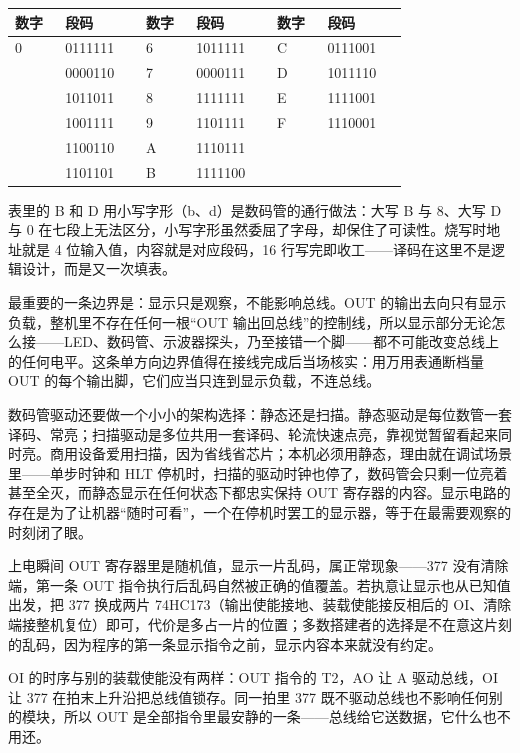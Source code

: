 \begin{longtable}{L{0.10\linewidth}L{0.16\linewidth}L{0.10\linewidth}L{0.16\linewidth}L{0.10\linewidth}L{0.16\linewidth}}
\toprule
数字 & 段码 & 数字 & 段码 & 数字 & 段码 \\
 & 0111111 & 6 & 1011111 & C & 0111001 \\ & 0000110 & 7 & 0000111 & D & 1011110 \\ & 1011011 & 8 & 1111111 & E & 1111001 \\ & 1001111 & 9 & 1101111 & F & 1110001 \\ & 1100110 & A & 1110111 & & \\ & 1101101 & B & 1111100 & & \\
\bottomrule
\end{longtable}

表里的 B 和 D 用小写字形（b、d）是数码管的通行做法：大写 B 与 8、大写 D 与 0 在七段上无法区分，小写字形虽然委屈了字母，却保住了可读性。烧写时地址就是 4 位输入值，内容就是对应段码，16 行写完即收工——译码在这里不是逻辑设计，而是又一次填表。

最重要的一条边界是：显示只是观察，不能影响总线。OUT 的输出去向只有显示负载，整机里不存在任何一根“OUT 输出回总线”的控制线，所以显示部分无论怎么接——LED、数码管、示波器探头，乃至接错一个脚——都不可能改变总线上的任何电平。这条单方向边界值得在接线完成后当场核实：用万用表通断档量 OUT 的每个输出脚，它们应当只连到显示负载，不连总线。

数码管驱动还要做一个小小的架构选择：静态还是扫描。静态驱动是每位数管一套译码、常亮；扫描驱动是多位共用一套译码、轮流快速点亮，靠视觉暂留看起来同时亮。商用设备爱用扫描，因为省线省芯片；本机必须用静态，理由就在调试场景里——单步时钟和 HLT 停机时，扫描的驱动时钟也停了，数码管会只剩一位亮着甚至全灭，而静态显示在任何状态下都忠实保持 OUT 寄存器的内容。显示电路的存在是为了让机器“随时可看”，一个在停机时罢工的显示器，等于在最需要观察的时刻闭了眼。

上电瞬间 OUT 寄存器里是随机值，显示一片乱码，属正常现象——377 没有清除端，第一条 OUT 指令执行后乱码自然被正确的值覆盖。若执意让显示也从已知值出发，把 377 换成两片 74HC173（输出使能接地、装载使能接反相后的 OI、清除端接整机复位）即可，代价是多占一片的位置；多数搭建者的选择是不在意这片刻的乱码，因为程序的第一条显示指令之前，显示内容本来就没有约定。

OI 的时序与别的装载使能没有两样：OUT 指令的 T2，AO 让 A 驱动总线，OI 让 377 在拍末上升沿把总线值锁存。同一拍里 377 既不驱动总线也不影响任何别的模块，所以 OUT 是全部指令里最安静的一条——总线给它送数据，它什么也不用还。

